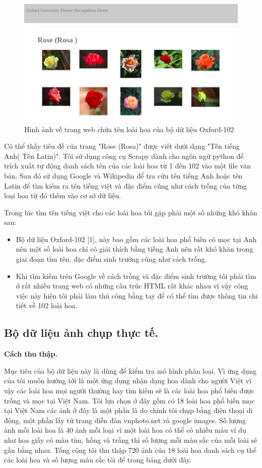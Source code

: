 \documentclass[12pt]{report}
\begin{document}
		\begin{figure}[h]
			\centering
			\includegraphics[scale=0.35]{rose_oxford}
			\caption{Hình ảnh về trang web chứa tên loài hoa của bộ dữ liệu Oxford-102}
			\label{fig:rose_oxford}
		\end{figure}
				
		Có thể thấy tiêu đề của trang "Rose (Rosa)" được viết dưới dạng "Tên tiếng Anh( Tên Latin)". Tôi sử dụng công cụ Scrapy dành cho ngôn ngữ python để trích xuất tự động danh sách tên của các loài hoa từ 1 đến 102 vào một file văn bản. Sau đó sử dụng Google và Wikipedia để tra cứu tên tiếng Anh hoặc tên Latin để tìm kiếm ra tên tiếng việt và đặc điểm cũng như cách trồng của từng loại hoa từ đó thêm vào cơ sở dữ liệu.
						
		Trong lúc tìm tên tiếng việt cho các loài hoa tôi gặp phải một số những khó khăn sau:
		\begin{itemize}
			\item Bộ dữ liệu Oxford-102 [1], này bao gồm các loài hoa phổ biến có mọc tại Anh nên một số loài hoa chỉ có giải thích bằng tiếng Anh nên rất khó khăn trong giai đoạn tìm tên, đặc điểm sinh trưởng cũng như cách trồng.
			\item Khi tìm kiếm trên Google về cách trồng và đặc điểm sinh trưởng tôi phải tìm ở rất nhiều trang web có những cấu trúc HTML rất khác nhau vì vậy công việc này hiện tôi phải làm thủ công bằng tay để có thể tìm được thông tin chi tiết về 102 loài hoa.
		\end{itemize}
				
		\subsection{Bộ dữ liệu ảnh chụp thực tế.}
		\textbf{Cách thu thập.}
				
		Mục tiêu của bộ dữ liệu này là dùng để kiểm tra mô hình phân loại. Vì ứng dụng của tôi muốn hướng tới là một ứng dụng nhận dạng hoa dành cho người Việt vì vậy các loài hoa mọi người thường hay tìm kiếm sẽ là các loài hoa phổ biến được trồng và mọc tại Việt Nam. Tôi lựa chọn ở đây gồm có 18 loài hoa phổ biến mọc tại Việt Nam các ảnh ở đây là một phần là do chính tôi chụp bằng điện thoại di động, một phần lấy từ trang diễn đàn vnphoto.net và google images. Số lượng ảnh mỗi loài hoa là 40 ảnh mỗi loại vì một loài hoa có thể có nhiều màu ví dụ như hoa giấy có màu tím, hồng và trắng thì số lượng mỗi màu sắc của mỗi loài sẽ gần bằng nhau. Tổng cộng tôi thu thập 720 ảnh của 18 loài hoa danh sách cụ thể các loài hoa và số lượng màu sắc tôi để trong bảng dưới đây.
				
\end{document}
